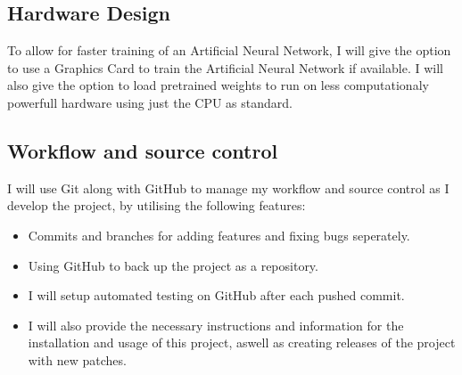 \documentclass[./project-report/src/latex/project-report.tex]{subfiles}
\begin{document}
\subsection{Hardware Design}

To allow for faster training of an Artificial Neural Network, I will give the option to use a Graphics Card to train the Artificial Neural Network if available. 
I will also give the option to load pretrained weights to run on less computationaly powerfull hardware using just the CPU as standard.

\subsection{Workflow and source control}

I will use Git along with GitHub to manage my workflow and source control as I develop the project, by utilising the following features:

\begin{itemize}
    \item Commits and branches for adding features and fixing bugs seperately.
    \item Using GitHub to back up the project as a repository.
    \item I will setup automated testing on GitHub after each pushed commit.
    \item I will also provide the necessary instructions and information for the installation and usage of this project, aswell as creating releases of the project 
          with new patches.
\end{itemize}
\end{document}
